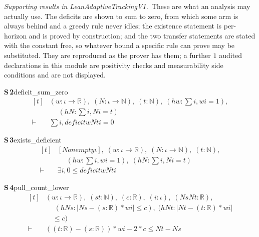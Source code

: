 \documentclass[conference]{IEEEtran}
\theoremstyle{definition}
\newcommand{\lean}[1]{\textsf{\footnotesize #1}}
\begin{document}
\noindent\emph{Supporting results in \lean{LeanAdaptiveTrackingV1}.}~These are what an analysis may actually use. The deficits are shown to sum to zero, from which some arm is always behind and a greedy rule never idles; the existence statement is per-horizon and is proved by construction; and the two transfer statements are stated with the constant free, so whatever bound a specific rule can prove may be substituted. They are reproduced as the prover has them; a further $1$ audited declarations in this module are positivity checks and measurability side conditions and are not displayed.

\noindent\textbf{S\,2}\quad\lean{deficit\_sum\_zero}
{\footnotesize\[ \begin{aligned}[t]
&(\mathit{w} : \iota \to \mathbb{R} ),\; (\mathit{N} : \iota \to \mathbb{N} ),\; (\mathit{t} : \mathbb{N} ),\; (\mathit{hw} : \textstyle\sum \mathit{i}, \mathit{w} \mathit{i} = 1),\\
&\quad \; (\mathit{hN} : \textstyle\sum \mathit{i}, \mathit{N} \mathit{i} = \mathit{t})\\
\vdash\;&\textstyle\sum \mathit{i}, \mathit{deficit} \mathit{w} \mathit{N} \mathit{t} \mathit{i} = 0
\end{aligned} \]}

\noindent\textbf{S\,3}\quad\lean{exists\_deficient}
{\footnotesize\[ \begin{aligned}[t]
&[\mathit{Nonempty} \iota ],\; (\mathit{w} : \iota \to \mathbb{R} ),\; (\mathit{N} : \iota \to \mathbb{N} ),\; (\mathit{t} : \mathbb{N} ),\\
&\quad \; (\mathit{hw} : \textstyle\sum \mathit{i}, \mathit{w} \mathit{i} = 1),\; (\mathit{hN} : \textstyle\sum \mathit{i}, \mathit{N} \mathit{i} = \mathit{t})\\
\vdash\;&\exists \mathit{i}, 0 \leq \mathit{deficit} \mathit{w} \mathit{N} \mathit{t} \mathit{i}
\end{aligned} \]}

\noindent\textbf{S\,4}\quad\lean{pull\_count\_lower}
{\footnotesize\[ \begin{aligned}[t]
&(\mathit{w} : \iota \to \mathbb{R} ),\; (\mathit{s} \mathit{t} : \mathbb{N} ),\; (\mathit{c} : \mathbb{R} ),\; (\mathit{i} : \iota ),\; (\mathit{Ns} \mathit{Nt} : \mathbb{R} ),\\
&\quad \; (\mathit{hNs} : |\mathit{Ns} - (\mathit{s} : \mathbb{R} ) * \mathit{w} \mathit{i}| \leq \mathit{c}),\; (\mathit{hNt} : |\mathit{Nt} - (\mathit{t} : \mathbb{R} ) * \mathit{w} \mathit{i}|\\
&\quad \leq \mathit{c})\\
\vdash\;&((\mathit{t} : \mathbb{R} ) - (\mathit{s} : \mathbb{R} )) * \mathit{w} \mathit{i} - 2 * \mathit{c} \leq \mathit{Nt} - \mathit{Ns}
\end{aligned} \]}
\end{document}
